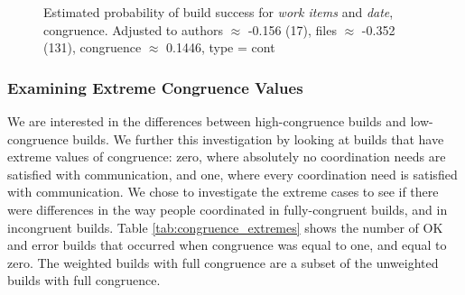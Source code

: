 \begin{figure}[t]
\centering
  \caption{Estimated probability of build success for \emph{work items} and \emph{date},  congruence. Adjusted to authors $\approx$ -0.156 (17), files $\approx$ -0.352 (131), congruence $\approx$ 0.1446, type = cont}
  \label{fig:weighted_congruence_workitems_age}
\end{figure}

\subsubsection{Examining Extreme Congruence Values}
\label{sec:extremecongruence}
We are interested in the differences between high-congruence builds and low-congruence builds.
We further this investigation by looking at builds that have extreme values of congruence: zero, where absolutely no coordination needs are satisfied with communication, and one, where every coordination need is satisfied with communication.
We chose to investigate the extreme cases to see if there were differences in the way people coordinated in fully-congruent builds, and in incongruent builds.
Table \ref{tab:congruence_extremes} shows the number of OK and error builds that occurred when congruence was equal to one, and equal to zero. The weighted builds with full congruence are a subset of the unweighted builds with full congruence.


